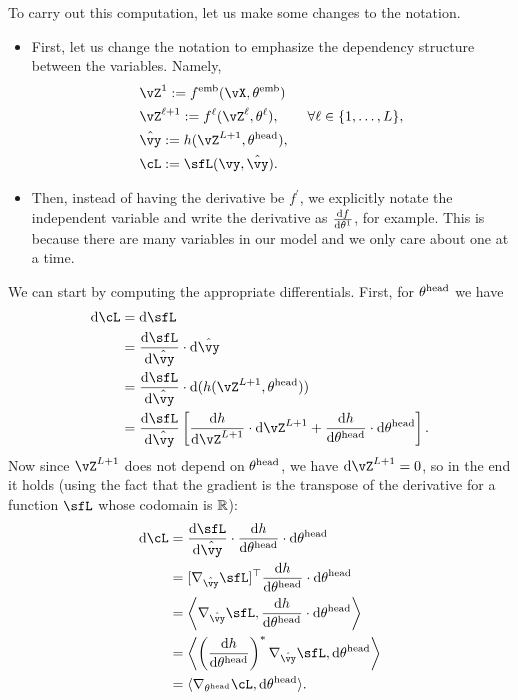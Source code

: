 \documentclass[../../book-main.tex]{subfiles}
\begin{document}
To carry out this computation, let us make some changes to the notation. 
\begin{itemize}
    \item First, let us change the notation to emphasize the dependency structure between the variables. Namely, 
    \begin{align}
        &\vZ^{1} := f^{\emb}(\vX, \theta^{\emb}) \\ 
        &\vZ^{\ell + 1} := f^{\ell}(\vZ^{\ell}, \theta^{\ell}), \qquad \forall \ell \in \{1, \dots, L\}, \\
        &\hat{\vy} := h(\vZ^{L+1}, \theta^{\head}), \\ 
        &\cL := \sfL(\vy, \hat{\vy}).
    \end{align}
    \item Then, instead of having the derivative be \(f^{\prime}\), we explicitly notate the independent variable and write the derivative as \(\odv{f}{\theta^{1}}\), for example. This is because there are many variables in our model and we only care about one at a time.
\end{itemize}
We can start by computing the appropriate differentials. First, for \(\theta^{\mathrm{head}}\) we have
\begin{align}
    \odif{\cL}
    &= \odif{\sfL} \\ 
    &= \odv{\sfL}{\hat{\vy}}\cdot\odif{\hat{\vy}} \\ 
    &= \odv{\sfL}{\hat{\vy}}\cdot\odif{{(h(\vZ^{L + 1}, \theta^{\head}))}} \\ 
    &= \odv{\sfL}{\hat{\vy}}\bs{\odv{h}{\vZ^{L + 1}}\cdot\odif{\vZ}^{L + 1} + \odv{h}{\theta^{\head}}\cdot\odif{\theta}^{\head}}.
\end{align}
Now since \(\vZ^{L + 1}\) does not depend on \(\theta^{\mathrm{head}}\), we have \(\odif{\vZ}^{L + 1} = 0\), so in the end it holds (using the fact that the gradient is the transpose of the derivative for a function \(\sfL\) whose codomain is \(\mathbb{R}\)):
\begin{align}
    \odif{\cL} 
    &= \odv{\sfL}{\hat{\vy}}\cdot\odv{h}{\theta^{\head}}\cdot\odif{\theta}^{\head} \\ 
    &= [\nabla_{\hat{\vy}}\sfL]^{\top}\odv{h}{\theta^{\head}}\cdot\odif{\theta}^{\head} \\ 
    &= \ip*{\nabla_{\hat{\vy}}\sfL}{\odv{h}{\theta^{\head}}\cdot\odif{\theta}^{\head}} \\
    &= \ip*{\bp{\odv{h}{\theta^{\head}}}^{*}\nabla_{\hat{\vy}}\sfL}{\odif{\theta}^{\head}} \\ 
    &= \ip{\nabla_{\theta^{\head}}\cL}{\odif{\theta}^{\head}}.
\end{align}
\end{document}

